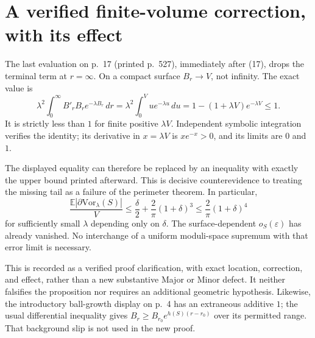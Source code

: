 \documentclass[10pt]{article}
\begin{document}
\section*{A verified finite-volume correction, with its effect}
The last evaluation on p. 17 (printed p. 527), immediately after (17), drops the terminal term at \(r=\infty\). On a compact surface \(B_r\to V\), not infinity. The exact value is \[\lambda^2\int_0^\infty B'_r B_r e^{-\lambda B_r}\,dr
 =\lambda^2\int_0^V u e^{-\lambda u}\,du
 =1-(1+\lambda V)e^{-\lambda V}\leq1.\] It is strictly less than \(1\) for finite positive \(\lambda V\). Independent symbolic integration verifies the identity; its derivative in \(x=\lambda V\) is \(xe^{-x}>0\), and its limits are \(0\) and \(1\).\par
The displayed equality can therefore be replaced by an inequality with exactly the upper bound printed afterward. This is decisive counterevidence to treating the missing tail as a failure of the perimeter theorem. In particular, \[\frac{\mathbb E|\partial\mathrm{Vor}_\lambda(S)|}{V}
 \leq\frac{\delta}{2}+\frac2\pi(1+\delta)^3
 \leq\frac2\pi(1+\delta)^4\] for sufficiently small \(\lambda\) depending only on \(\delta\). The surface-dependent \(o_S(\varepsilon)\) has already vanished. No interchange of a uniform moduli-space supremum with that error limit is necessary.\par
This is recorded as a verified proof clarification, with exact location, correction, and effect, rather than a new substantive Major or Minor defect. It neither falsifies the proposition nor requires an additional geometric hypothesis. Likewise, the introductory ball-growth display on p. 4 has an extraneous additive \(1\); the usual differential inequality gives \(B_r\geq B_{r_0}e^{h(S)(r-r_0)}\) over its permitted range. That background slip is not used in the new proof.\par
\end{document}
